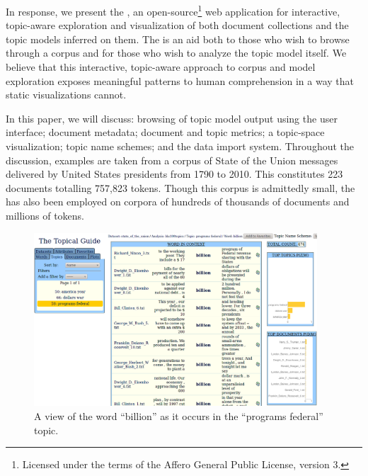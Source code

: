 \documentclass[11pt]{article}
\newcommand{\comments}[1]{}
\begin{document}
In response, we present the \tool, an open-source\footnote{Licensed under the terms of the Affero
General Public License, version 3.} web application for interactive,
topic-aware exploration and visualization of both document collections and the
topic models inferred on them.\comments{\footnote{Further information on the project, including %
source code access and a live demonstration server, can be found
at \texttt{\projecturl}.}} The \tool{} is an aid both to those who wish to
browse through a corpus and for those who wish to analyze the topic model itself.
We believe that this interactive, topic-aware approach to corpus and model exploration
exposes meaningful patterns to human comprehension in a way that static visualizations cannot.

In this paper, we will discuss: browsing of topic model output using the \tool{} user interface\comments{, as in \newcite{gardner_browser_2010}}; %
document metadata; document and topic metrics; a topic-space visualization;
topic name schemes; and the data import
system. Throughout the discussion, examples are taken from a
corpus of State of the Union messages delivered by United States presidents
from 1790 to 2010. This constitutes 223 documents totalling 757,823 tokens.
Though this corpus is admittedly small, the \tool{} has also been employed
on corpora of hundreds of thousands of documents and millions of tokens.

\begin{figure}[t]
 \centering
 \includegraphics[width=400px,keepaspectratio=true]{./topic_word_view3.png}
 \caption{A view of the word ``billion'' as it occurs in the ``programs federal'' topic.}
 \label{fig:topic_word}
\end{figure}
\end{document}
